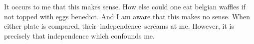 

It occurs to me that this makes sense.  How else could one eat belgian
waffles if not topped with eggs benedict.  And I am aware that this
makes no sense.  When either plate is compared, their\ independence\ 
screams at me.  However, it is precisely that independence which
confounds me.

\bye
